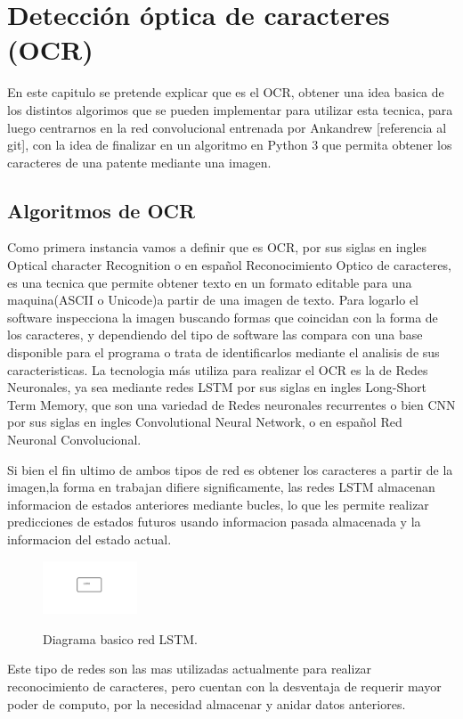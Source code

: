\chapter{Detección óptica de caracteres (OCR)}
En este capitulo se pretende explicar que es el OCR, obtener una idea basica
de los distintos algorimos que se pueden implementar para
utilizar esta tecnica, para luego centrarnos en la red convolucional entrenada por
Ankandrew [referencia al git], con la idea de finalizar en un algoritmo en Python 3
que permita obtener los caracteres de una patente mediante una imagen.

\section{Algoritmos de OCR}
Como primera instancia vamos a definir que es OCR, por sus siglas en ingles Optical character
Recognition o en español Reconocimiento Optico de caracteres, es una tecnica que permite
obtener texto en un formato editable para una maquina(ASCII o Unicode)a partir de una imagen
de texto.
Para logarlo el software inspecciona la imagen buscando formas que coincidan con la forma
de los caracteres, y dependiendo del tipo de software las compara con una base disponible
para el programa o trata de identificarlos mediante el analisis de sus caracteristicas.
La tecnologia más utiliza para realizar el OCR es la de Redes Neuronales, ya sea
mediante redes LSTM por sus siglas en ingles Long-Short Term Memory, que son una variedad de Redes
neuronales recurrentes o bien CNN por sus siglas en ingles Convolutional Neural Network, o en español Red
Neuronal Convolucional.

Si bien el fin ultimo de ambos tipos de red es obtener los caracteres a partir de la imagen,la forma en
trabajan difiere significamente, las redes LSTM almacenan informacion de estados anteriores mediante bucles,
lo que les permite realizar predicciones de estados futuros usando informacion pasada almacenada y la informacion
del estado actual.
\begin{figure}[h]
    \centering
    \includegraphics[width=0.25\textwidth]{imgs/LSTM-diagrama.jpg}
    \label{fig:diagrama-LSTM}
    \caption{Diagrama basico red LSTM.}
\end{figure}
Este tipo de redes son las mas utilizadas actualmente para realizar reconocimiento de
caracteres, pero cuentan con la desventaja de requerir mayor poder de computo, por la necesidad
almacenar y anidar datos anteriores.

